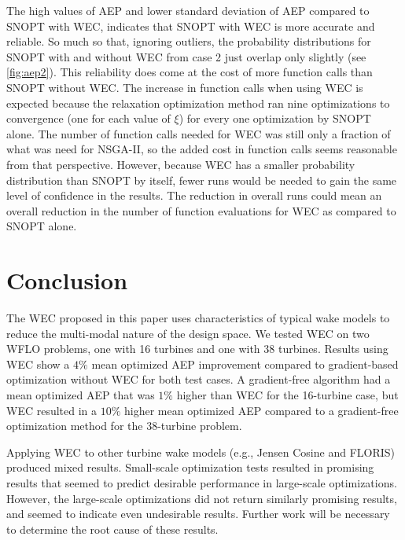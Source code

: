 \documentclass[a4paper]{jpconf}
\begin{document}
The high values of AEP and lower standard deviation of AEP compared to SNOPT with WEC, indicates that SNOPT with WEC is more accurate and reliable. So much so that, ignoring outliers, the probability distributions for SNOPT with and without WEC from case 2 just overlap only slightly (see \cref{fig:aep2}). This reliability does come at the cost of more function calls than SNOPT without WEC. The increase in function calls when using WEC is expected because the relaxation optimization method ran nine optimizations to convergence (one for each value of $\xi$) for every one optimization by SNOPT alone. The number of function calls needed for WEC was still only a fraction of what was need for NSGA-II, so the added cost in function calls seems reasonable from that perspective. However, because WEC has a smaller probability distribution than SNOPT by itself, fewer runs would be needed to gain the same level of confidence in the results. The reduction in overall runs could mean an overall reduction in the number of function evaluations for WEC as compared to SNOPT alone.

\section{Conclusion}
The WEC proposed in this paper uses characteristics of typical wake models to reduce the multi-modal nature of the design space. We tested WEC on two WFLO problems, one with 16 turbines and one with 38 turbines. Results using WEC show a $4\%$ mean optimized AEP improvement compared to gradient-based optimization without WEC for both test cases. A gradient-free algorithm had a mean optimized AEP that was $1\%$ higher than WEC for the 16-turbine case, but WEC resulted in a $10\%$ higher mean optimized AEP compared to a gradient-free optimization method for the 38-turbine problem.

Applying WEC to other turbine wake models (e.g., Jensen Cosine and FLORIS) produced mixed results. Small-scale optimization tests resulted in promising results that seemed to predict desirable performance in large-scale optimizations. However, the large-scale optimizations did not return similarly promising results, and seemed to indicate even undesirable results. Further work will be necessary to determine the root cause of these results.

\end{document}

